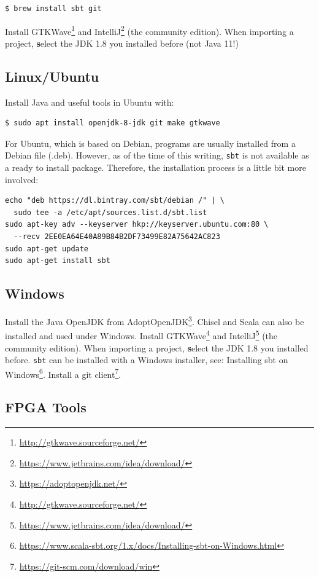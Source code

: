 \documentclass[%
    10pt,
    headinclude, footexclude,
    openright, %
    notitlepage,
    cleardoubleempty,
    headsepline,
    pointlessnumbers,
    bibtotoc, idxtotoc,
    ]{scrbook}
\newcommand{\code}[1]{{\small{\texttt{#1}}}}
\newcommand{\myref}[2]{\href{#1}{#2}}
\renewcommand{\myref}[2]{{#2}{\footnote{\url{#1}}}}
\begin{document}
\begin{verbatim}
$ brew install sbt git
\end{verbatim}

Install \myref{http://gtkwave.sourceforge.net/}{GTKWave} and
\myref{https://www.jetbrains.com/idea/download/}{IntelliJ} (the community edition).
When importing a project, {\textbf select the JDK 1.8} you installed before (not Java 11!)

\subsection{Linux/Ubuntu}

Install Java and useful tools in Ubuntu with:
\begin{verbatim}
$ sudo apt install openjdk-8-jdk git make gtkwave
\end{verbatim}

For Ubuntu, which is based on Debian, programs are usually installed from a
Debian file (.deb). However, as of the time of this writing, \code{sbt} is not
available as a ready to install package. Therefore, the installation process
is a little bit more involved:
\begin{verbatim}
echo "deb https://dl.bintray.com/sbt/debian /" | \
  sudo tee -a /etc/apt/sources.list.d/sbt.list
sudo apt-key adv --keyserver hkp://keyserver.ubuntu.com:80 \
  --recv 2EE0EA64E40A89B84B2DF73499E82A75642AC823
sudo apt-get update
sudo apt-get install sbt
\end{verbatim}

\subsection{Windows}

Install the Java OpenJDK from \myref{https://adoptopenjdk.net/}{AdoptOpenJDK}.
Chisel and Scala can also be installed and used under Windows.
Install \myref{http://gtkwave.sourceforge.net/}{GTKWave} and
\myref{https://www.jetbrains.com/idea/download/}{IntelliJ} (the community edition).
When importing a project, {\textbf select the JDK 1.8} you installed before.
\code{sbt} can be installed with a Windows installer, see:
\myref{https://www.scala-sbt.org/1.x/docs/Installing-sbt-on-Windows.html}{Installing sbt on Windows}.
Install a \myref{https://git-scm.com/download/win}{git client}.

\subsection{FPGA Tools}
\end{document}
